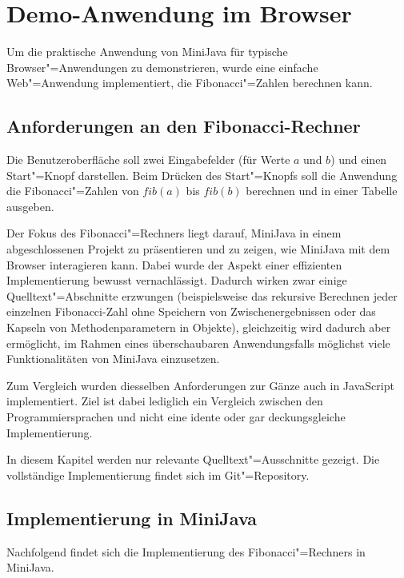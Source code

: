 \chapter{Demo-Anwendung im Browser}
\label{cha:DemoAnwendung}

Um die praktische Anwendung von MiniJava für typische Browser"=Anwendungen zu demonstrieren, wurde eine einfache Web"=Anwendung implementiert, die Fibonacci"=Zahlen berechnen kann.

\section{Anforderungen an den Fibonacci-Rechner}
Die Benutzeroberfläche soll zwei Eingabefelder (für Werte $a$ und $b$) und einen Start"=Knopf darstellen. Beim Drücken des Start"=Knopfs soll die Anwendung die Fibonacci"=Zahlen von $fib(a)$ bis $fib(b)$ berechnen und in einer Tabelle ausgeben.

Der Fokus des Fibonacci"=Rechners liegt darauf, MiniJava in einem abgeschlossenen Projekt zu präsentieren und zu zeigen, wie MiniJava mit dem Browser interagieren kann. Dabei wurde der Aspekt einer effizienten Implementierung bewusst vernachlässigt. Dadurch wirken zwar einige Quelltext"=Abschnitte erzwungen (beispielsweise das rekursive Berechnen jeder einzelnen Fibonacci-Zahl ohne Speichern von Zwischenergebnissen oder das Kapseln von Methodenparametern in Objekte), gleichzeitig wird dadurch aber ermöglicht, im Rahmen eines überschaubaren Anwendungsfalls möglichst viele Funktionalitäten von MiniJava einzusetzen.

Zum Vergleich wurden diesselben Anforderungen zur Gänze auch in JavaScript implementiert. Ziel ist dabei lediglich ein Vergleich zwischen den Programmiersprachen und nicht eine idente oder gar deckungsgleiche Implementierung.

In diesem Kapitel werden nur relevante Quelltext"=Ausschnitte gezeigt. Die vollständige Implementierung findet sich im Git"=Repository.

\pagebreak
\section{Implementierung in MiniJava}

Nachfolgend findet sich die Implementierung des Fibonacci"=Rechners in MiniJava.

\pagebreak




